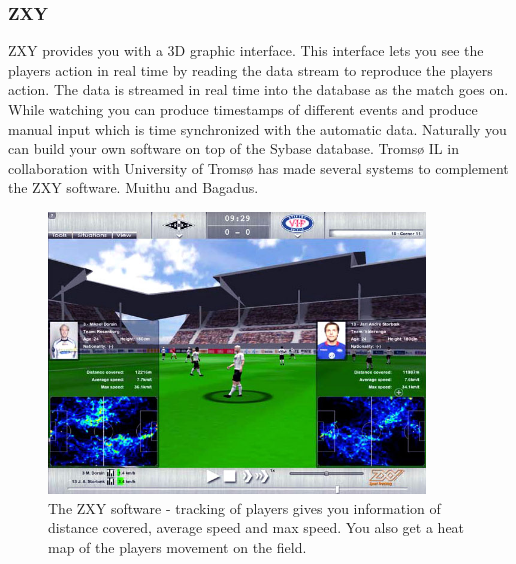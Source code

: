 \subsubsection{ZXY}
  
ZXY provides you with a 3D graphic interface. This interface lets you see the players action in real time by reading the data stream to reproduce the players action. The data is streamed in real time into the database as the match goes on. While watching you can produce timestamps of different events and produce manual input which is time synchronized with the automatic data. Naturally you can build your own software on top of the Sybase database. Tromsø IL in collaboration with University of Tromsø has made several systems to complement the ZXY software. Muithu and Bagadus.

\begin{figure}[ht!]
\centering
\includegraphics[width=100mm]{images/general/zxysoftware.png}
\caption{The ZXY software - tracking of players gives you information of distance covered, average speed and max speed. You also get a heat map of the players movement on the field.}
\label{overflow}
\end{figure}

\cite{dailymailOnStatistics}

